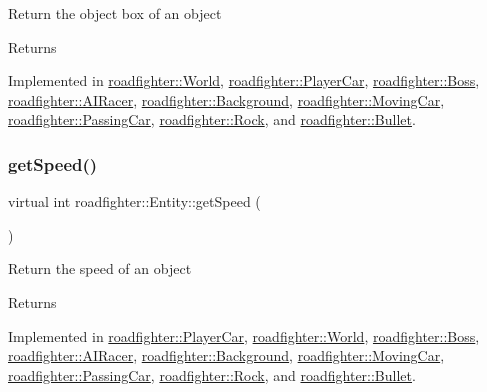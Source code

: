 Return the object box of an object \begin{DoxyReturn}{Returns}

\end{DoxyReturn}


Implemented in \hyperlink{classroadfighter_1_1World_a8825a89883229773abb09bb05ee89714}{roadfighter\+::\+World}, \hyperlink{classroadfighter_1_1PlayerCar_ac0b95a6ef2829905ad4717a52b7cb5eb}{roadfighter\+::\+Player\+Car}, \hyperlink{classroadfighter_1_1Boss_a3cf68c683f4352908eab55fc6ee29e9e}{roadfighter\+::\+Boss}, \hyperlink{classroadfighter_1_1AIRacer_a597fa189f88db3ca1534ddf24bb51c22}{roadfighter\+::\+A\+I\+Racer}, \hyperlink{classroadfighter_1_1Background_af25322839a52bc232266cceb2a85dd7d}{roadfighter\+::\+Background}, \hyperlink{classroadfighter_1_1MovingCar_a8b744958eaba45078e98fad4ac6821c3}{roadfighter\+::\+Moving\+Car}, \hyperlink{classroadfighter_1_1PassingCar_aeee1f7e16dcef7adc0a4bea629b0d42b}{roadfighter\+::\+Passing\+Car}, \hyperlink{classroadfighter_1_1Rock_a286656165c7dd3cdf66945e47f6fa4c7}{roadfighter\+::\+Rock}, and \hyperlink{classroadfighter_1_1Bullet_a3e410865547614ec0470eb6ad18cc2c4}{roadfighter\+::\+Bullet}.

\mbox{\label{classroadfighter_1_1Entity_ad3760184d764a61922e1db7d98501ee4}} 
\subsubsection{\texorpdfstring{get\+Speed()}{getSpeed()}}
{\footnotesize\ttfamily virtual int roadfighter\+::\+Entity\+::get\+Speed (\begin{DoxyParamCaption}{ }\end{DoxyParamCaption})\hspace{0.3cm}{\ttfamily [pure virtual]}}

Return the speed of an object \begin{DoxyReturn}{Returns}

\end{DoxyReturn}


Implemented in \hyperlink{classroadfighter_1_1PlayerCar_a642a825b604a407ae4711bdafd054b22}{roadfighter\+::\+Player\+Car}, \hyperlink{classroadfighter_1_1World_a0ec7ca6d1df344ec56cf55d6d436b24c}{roadfighter\+::\+World}, \hyperlink{classroadfighter_1_1Boss_a348151aa9aabb3baabf9a8cc0b6955cb}{roadfighter\+::\+Boss}, \hyperlink{classroadfighter_1_1AIRacer_a4fa90fd500b2e790fb50cc6f1505688f}{roadfighter\+::\+A\+I\+Racer}, \hyperlink{classroadfighter_1_1Background_acbeaa8438617d67f8069347000e185a1}{roadfighter\+::\+Background}, \hyperlink{classroadfighter_1_1MovingCar_a42bdd9382e7234ae79d6f5e582adee92}{roadfighter\+::\+Moving\+Car}, \hyperlink{classroadfighter_1_1PassingCar_afae62d9c6037d5ce8f74bb2e2ed363ac}{roadfighter\+::\+Passing\+Car}, \hyperlink{classroadfighter_1_1Rock_ab3f596c927c49ab4b159391dc7287192}{roadfighter\+::\+Rock}, and \hyperlink{classroadfighter_1_1Bullet_ad05d66d01f1f839e1f38c6f12a0b091b}{roadfighter\+::\+Bullet}.

